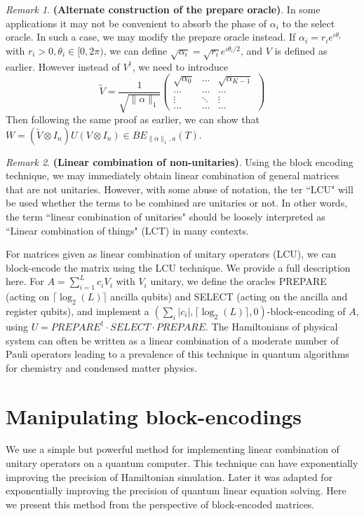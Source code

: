 \documentclass[12pt, oneside]{book}
\theoremstyle{definition}
\theoremstyle{definition}
\theoremstyle{remark}
\newtheorem*{remark}{Remark}
\begin{document}
\begin{remark} 
\textbf{(Alternate construction of the prepare oracle)}. In some applications it may not be convenient to absorb the phase of $\alpha_i$ to the select oracle. In such a case, we may modify the prepare oracle instead. If $\alpha_i=r_ie^{\iota \theta_i}$ with $r_i>0,\theta_i \in [0,2\pi)$, we can define $\sqrt{\alpha_i} = \sqrt{r_i} e^{\iota \theta_i/2}$, and $V$ is defined as earlier. However instead of $V^{\dagger}$, we need to introduce
\[
\tilde{V} =\frac{1}{\sqrt{\|\alpha\|_1}} \begin{pmatrix} \sqrt{\alpha_0} & \ldots & \sqrt{\alpha_{K-1}} \\ 
\ldots & \ldots & \ldots \\
\vdots & \ddots & \vdots \\
\ldots & \ldots & \ldots \end{pmatrix}
\]
Then following the same proof as earlier, we can show that $W=(\tilde{V}\otimes I_n)U(V\otimes I_n) \in BE_{\|\alpha\|_1,a}(T)$.
\end{remark}
\begin{remark}
    \textbf{(Linear combination of non-unitaries)}. Using the block encoding technique, we may immediately obtain linear combination of general matrices that are not unitaries. However, with some abuse of notation, the ter ``LCU" will be used whether the terms to be combined are unitaries or not. In other words, the term ``linear combination of unitaries" should be loosely interpreted as ``Linear combination of things" (LCT) in many contexts.
\end{remark}    

For matrices given as linear combination of unitary operators (LCU), we can block-encode the matrix using the LCU technique. We provide a full description here. For $A=\sum_{i=1}^L c_iV_i$ with $V_i$ unitary, we define the oracles PREPARE (acting on $\lceil \log_2(L)\rceil$ ancilla qubits) and SELECT (acting on the ancilla and register qubits), and implement a $(\sum_i |c_i|,\lceil\log_2(L)\rceil,0)$-block-encoding of $A$, using $U=PREPARE^{\dagger}\cdot SELECT\cdot PREPARE$. The Hamiltonians of physical system can often be written as a linear combination of a moderate number of Pauli operators leading to a prevalence of this technique in quantum algorithms for chemistry and condensed matter physics.

\section{Manipulating block-encodings}
We use a simple but powerful method for implementing linear combination of unitary operators on a quantum computer. This technique can have exponentially improving the precision of Hamiltonian simulation. Later it was adapted for exponentially improving the precision of quantum linear equation solving. Here we present this method from the perspective of block-encoded matrices.
\end{document}
